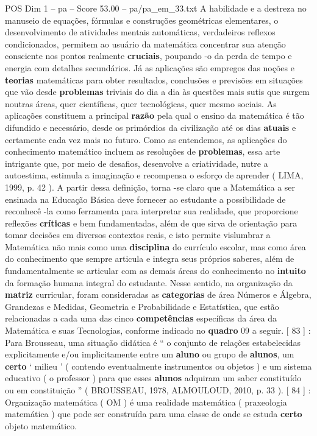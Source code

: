\begin{textsample}{POS Dim 1 – pa – Score 53.00 – pa/pa\_em\_33.txt}
A habilidade e a destreza no manuseio de equações, fórmulas e construções geométricas elementares, o desenvolvimento de atividades mentais automáticas, verdadeiros reflexos condicionados, permitem ao usuário da matemática concentrar sua atenção consciente nos pontos realmente \textbf{cruciais}, poupando -o da perda de tempo e energia com detalhes secundários.
Já as aplicações são empregos das noções e \textbf{teorias} matemáticas para obter resultados, conclusões e previsões em situações que vão desde \textbf{problemas} triviais do dia a dia às questões mais sutis que surgem noutras áreas, quer científicas, quer tecnológicas, quer mesmo sociais.
As aplicações constituem a principal \textbf{razão} pela qual o ensino da matemática é tão difundido e necessário, desde os primórdios da civilização até os dias \textbf{atuais} e certamente cada vez mais no futuro.
Como as entendemos, as aplicações do conhecimento matemático incluem as resoluções de \textbf{problemas}, essa arte intrigante que, por meio de desafios, desenvolve a criatividade, nutre a autoestima, estimula a imaginação e recompensa o esforço de aprender ( LIMA, 1999, p. 42 ).
A partir dessa definição, torna -se claro que a Matemática a ser ensinada na Educação Básica deve fornecer ao estudante a possibilidade de reconhecê -la como ferramenta para interpretar sua realidade, que proporcione reflexões \textbf{críticas} e bem fundamentadas, além de que sirva de orientação para tomar decisões em diversos contextos reais, e isto permite vislumbrar a Matemática não mais como uma \textbf{disciplina} do currículo escolar, mas como área do conhecimento que sempre articula e integra seus próprios saberes, além de fundamentalmente se articular com as demais áreas do conhecimento no \textbf{intuito} da formação humana integral do estudante.
Nesse sentido, na organização da \textbf{matriz} curricular, foram consideradas as \textbf{categorias} de área Números e Álgebra, Grandezas e Medidas, Geometria e Probabilidade e Estatística, que estão relacionadas a cada uma das cinco \textbf{competências} específicas da área da Matemática e suas Tecnologias, conforme indicado no \textbf{quadro} 09 a seguir. [ 83 ] : Para Brousseau, uma situação didática é “ o conjunto de relações estabelecidas explicitamente e/ou implicitamente entre um \textbf{aluno} ou grupo de \textbf{alunos}, um \textbf{certo} ‘ milieu ’ ( contendo eventualmente instrumentos ou objetos ) e um sistema educativo ( o professor ) para que esses \textbf{alunos} adquiram um saber constituído ou em constituição ” ( BROUSSEAU, 1978, ALMOULOUD, 2010, p. 33 ). [ 84 ] : Organização matemática ( OM ) é uma realidade matemática ( praxeologia matemática ) que pode ser construída para uma classe de onde se estuda \textbf{certo} objeto matemático.

\end{textsample}
